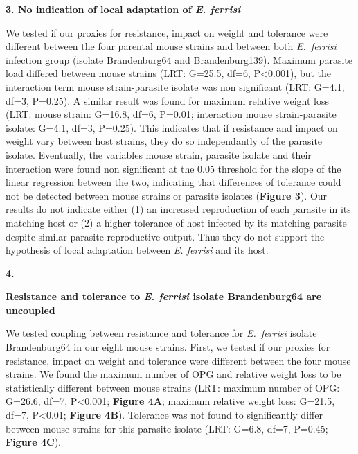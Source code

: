 \documentclass[12pt]{article}
\renewcommand{\_}{\kern-1.5pt\textunderscore\kern-1.5pt}
\begin{document}
\begin{FlushLeft}
{\fontsize{14pt}{16.8pt}\selectfont \textbf{\textcolor[HTML]{FF0000}{3. No indication of local adaptation of \textit{E. ferrisi}}}\par}
\end{FlushLeft}\par

\textcolor[HTML]{FF0000}{We tested if our proxies for resistance, impact on weight and tolerance were different between the four parental mouse strains and between both \textit{E. ferrisi} infection group (isolate Brandenburg64 and Brandenburg139). Maximum parasite load differed between mouse strains (LRT: G=25.5, df=6, P<0.001), but the interaction term mouse strain-parasite isolate was non significant (LRT: G=4.1, df=3, P=0.25). A similar result was found for maximum relative weight loss (LRT: mouse strain: G=16.8, df=6, P=0.01; interaction mouse strain-parasite isolate: G=4.1, df=3, P=0.25). This indicates that if resistance and impact on weight vary between host strains, they do so independantly of the parasite isolate. Eventually, the variables mouse strain, parasite isolate and their interaction were found non significant at the 0.05 threshold for the slope of the linear regression between the two, indicating that differences of tolerance could not be detected between mouse strains or parasite isolates (\textbf{Figure 3}). Our results do not indicate either (1) an increased reproduction of each parasite in its matching host or (2) a higher tolerance of host infected by its matching parasite despite similar parasite reproductive output. Thus they do not support the hypothesis of local adaptation between \textit{E. ferrisi} and its host. }\par

\begin{FlushLeft}
\textbf{\textcolor[HTML]{FF0000}{4. }}{\fontsize{14pt}{16.8pt}\selectfont \textbf{\textcolor[HTML]{FF0000}{Resistance and tolerance to \textit{E. ferrisi }isolate Brandenburg64 are uncoupled}}\par}
\end{FlushLeft}\par

\textcolor[HTML]{FF0000}{We tested coupling between resistance and tolerance for \textit{E. ferrisi} isolate Brandenburg64 in our eight mouse strains. First, we tested if our proxies for resistance, impact on weight and tolerance were different between the four mouse strains. We found the maximum number of OPG and relative weight loss to be statistically different between mouse strains (LRT: maximum number of OPG: G=26.6, df=7, P<0.001; \textbf{Figure 4A}; maximum relative weight loss: G=21.5, df=7, P<0.01; \textbf{Figure 4B}). Tolerance was not found to significantly differ between mouse strains for this parasite isolate (LRT: G=6.8, df=7, P=0.45; \textbf{Figure 4C}).}\par
\end{document}
